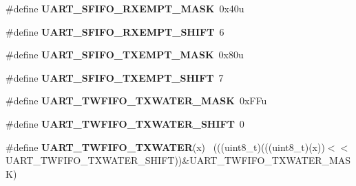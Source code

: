 \begin{DoxyCompactItemize}
\item 
\hypertarget{group___u_a_r_t___register___masks_ga672339d2930ef7864126ea9938d2c18d}{}\#define {\bfseries U\+A\+R\+T\+\_\+\+S\+F\+I\+F\+O\+\_\+\+R\+X\+E\+M\+P\+T\+\_\+\+M\+A\+S\+K}~0x40u\label{group___u_a_r_t___register___masks_ga672339d2930ef7864126ea9938d2c18d}

\item 
\hypertarget{group___u_a_r_t___register___masks_ga437bd92a0e905d88bf92615135b0672f}{}\#define {\bfseries U\+A\+R\+T\+\_\+\+S\+F\+I\+F\+O\+\_\+\+R\+X\+E\+M\+P\+T\+\_\+\+S\+H\+I\+F\+T}~6\label{group___u_a_r_t___register___masks_ga437bd92a0e905d88bf92615135b0672f}

\item 
\hypertarget{group___u_a_r_t___register___masks_ga50a1813a0e695d319434adaa157a4c3a}{}\#define {\bfseries U\+A\+R\+T\+\_\+\+S\+F\+I\+F\+O\+\_\+\+T\+X\+E\+M\+P\+T\+\_\+\+M\+A\+S\+K}~0x80u\label{group___u_a_r_t___register___masks_ga50a1813a0e695d319434adaa157a4c3a}

\item 
\hypertarget{group___u_a_r_t___register___masks_ga1856b521baf09271f8085380ef6e1cc5}{}\#define {\bfseries U\+A\+R\+T\+\_\+\+S\+F\+I\+F\+O\+\_\+\+T\+X\+E\+M\+P\+T\+\_\+\+S\+H\+I\+F\+T}~7\label{group___u_a_r_t___register___masks_ga1856b521baf09271f8085380ef6e1cc5}

\item 
\hypertarget{group___u_a_r_t___register___masks_ga4d1d724beef4708553a5066491ebf32e}{}\#define {\bfseries U\+A\+R\+T\+\_\+\+T\+W\+F\+I\+F\+O\+\_\+\+T\+X\+W\+A\+T\+E\+R\+\_\+\+M\+A\+S\+K}~0x\+F\+Fu\label{group___u_a_r_t___register___masks_ga4d1d724beef4708553a5066491ebf32e}

\item 
\hypertarget{group___u_a_r_t___register___masks_ga55b227e0cf4669aec87ec3fb3bb494c8}{}\#define {\bfseries U\+A\+R\+T\+\_\+\+T\+W\+F\+I\+F\+O\+\_\+\+T\+X\+W\+A\+T\+E\+R\+\_\+\+S\+H\+I\+F\+T}~0\label{group___u_a_r_t___register___masks_ga55b227e0cf4669aec87ec3fb3bb494c8}

\item 
\hypertarget{group___u_a_r_t___register___masks_ga011857b26eaebbc7729e6e8d00e67b44}{}\#define {\bfseries U\+A\+R\+T\+\_\+\+T\+W\+F\+I\+F\+O\+\_\+\+T\+X\+W\+A\+T\+E\+R}(x)                                  ~(((uint8\+\_\+t)(((uint8\+\_\+t)(x))$<$$<$U\+A\+R\+T\+\_\+\+T\+W\+F\+I\+F\+O\+\_\+\+T\+X\+W\+A\+T\+E\+R\+\_\+\+S\+H\+I\+F\+T))\&U\+A\+R\+T\+\_\+\+T\+W\+F\+I\+F\+O\+\_\+\+T\+X\+W\+A\+T\+E\+R\+\_\+\+M\+A\+S\+K)\label{group___u_a_r_t___register___masks_ga011857b26eaebbc7729e6e8d00e67b44}


\end{DoxyCompactItemize}
